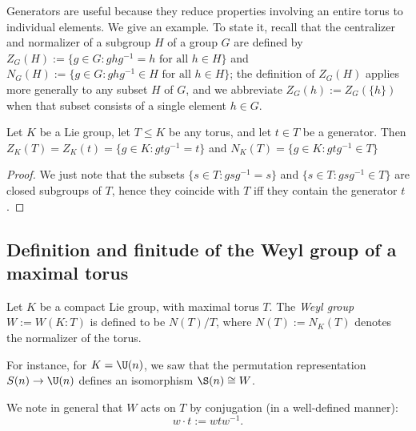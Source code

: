 \documentclass[reqno]{amsart} 
\begin{document}
Generators are useful because they reduce properties involving an entire torus to individual elements.  We give an example.  To state it, recall that the centralizer and normalizer of a subgroup $H$ of a group $G$ are defined by $Z_G(H) := \{g \in G : g h g^{-1} = h \text{ for all } h \in H\}$ and $N_G(H) := \{g \in G : g h g^{-1} \in H \text{ for all } h \in H\}$; the definition of $Z_G(H)$ applies more generally to any subset $H$ of $G$, and we abbreviate $Z_G(h) := Z_G(\{h\})$ when that subset consists of a single element $h \in G$.
\begin{lemma}\label{lem:generators-cent-norm}
  Let $K$ be a Lie group, let $T \leq K$ be any torus, and let $t \in T$ be a generator.  Then $Z_K(T) = Z_K(t) = \{g \in K : g t g^{-1} = t\}$ and $N_K(T) = \{g \in K : g t g^{-1} \in T\}$
\end{lemma}
\begin{proof}
  We just note that the subsets $\{s \in T : g s g^{-1} = s\}$ and $\{s \in T : g s g^{-1} \in T\}$ are closed subgroups of $T$, hence they coincide with $T$ iff they contain the generator $t$.
\end{proof}

\subsection{Definition and finitude of the Weyl group of a maximal torus}
\begin{definition}
  Let $K$ be a compact Lie group, with maximal torus $T$.  The \emph{Weyl group} $W := W(K:T)$ is defined to be $N(T)/T$, where $N(T) := N_K(T)$ denotes the normalizer of the torus.
\end{definition}
For instance, for $K = \U(n)$, we saw that the permutation representation $S(n) \rightarrow \U(n)$ defines an isomorphism $\S(n) \cong W$.

We note in general that $W$ acts on $T$ by conjugation (in a well-defined manner):
\begin{equation*}
  w \cdot t := w t w^{-1}.
\end{equation*}
\end{document}
